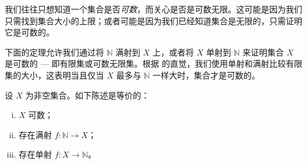 我们往往只想知道一个集合是否\textit{可数}，而关心是否是可数无限。这可能是因为我们只需找到集合大小的上限；或者可能是因为我们已经知道集合是无限的，只需证明它是可数的。

下面的定理允许我们通过将 $\mathbb{N}$ 满射到 $X$ 上，或者将 $X$ 单射到 $\mathbb{N}$ 来证明集合 $X$ 是可数的 --- 即有限集或可数无限集。根据  的直觉，我们使用单射和满射比较有限集的大小，这表明当且仅当 $X$ 最多与 $\mathbb{N}$ 一样大时，集合才是可数的。

\begin{theorem} \label{thmCountableFromInjSurj}
设 $X$ 为非空集合。如下陈述是等价的：
\begin{enumerate}[(i)]
\item $X$ 可数；
\item 存在满射 $f : \mathbb{N} \to X$；
\item 存在单射 $f : X \to \mathbb{N}$。
\end{enumerate}
\end{theorem}
